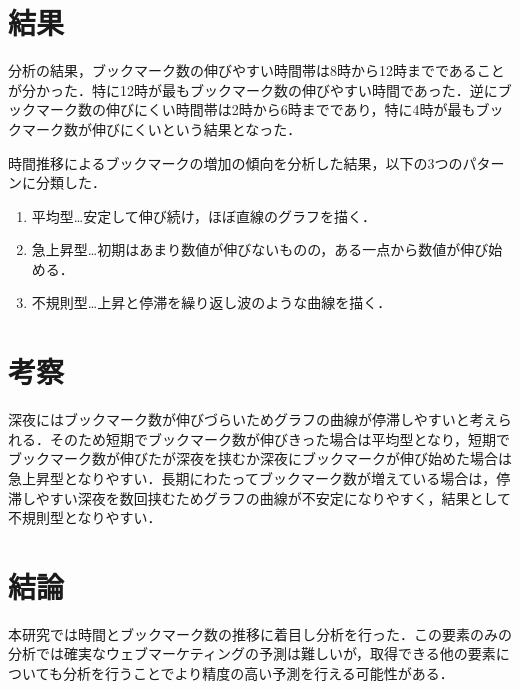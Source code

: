 \documentclass[uplatex,twocolumn,dvipdfmx]{jsarticle}
\begin{document}
\section{結果}
分析の結果，ブックマーク数の伸びやすい時間帯は8時から12時までであることが分かった．特に12時が最もブックマーク数の伸びやすい時間であった．逆にブックマーク数の伸びにくい時間帯は2時から6時までであり，特に4時が最もブックマーク数が伸びにくいという結果となった．\par
時間推移によるブックマークの増加の傾向を分析した結果，以下の3つのパターンに分類した．
\begin{enumerate}
\item 平均型…安定して伸び続け，ほぼ直線のグラフを描く．
\item 急上昇型…初期はあまり数値が伸びないものの，ある一点から数値が伸び始める．
\item 不規則型…上昇と停滞を繰り返し波のような曲線を描く． 
\end{enumerate}


\section{考察}
深夜にはブックマーク数が伸びづらいためグラフの曲線が停滞しやすいと考えられる．そのため短期でブックマーク数が伸びきった場合は平均型となり，短期でブックマーク数が伸びたが深夜を挟むか深夜にブックマークが伸び始めた場合は急上昇型となりやすい．長期にわたってブックマーク数が増えている場合は，停滞しやすい深夜を数回挟むためグラフの曲線が不安定になりやすく，結果として不規則型となりやすい．

\section{結論}
本研究では時間とブックマーク数の推移に着目し分析を行った．この要素のみの分析では確実なウェブマーケティングの予測は難しいが，取得できる他の要素についても分析を行うことでより精度の高い予測を行える可能性がある．



\end{document}
